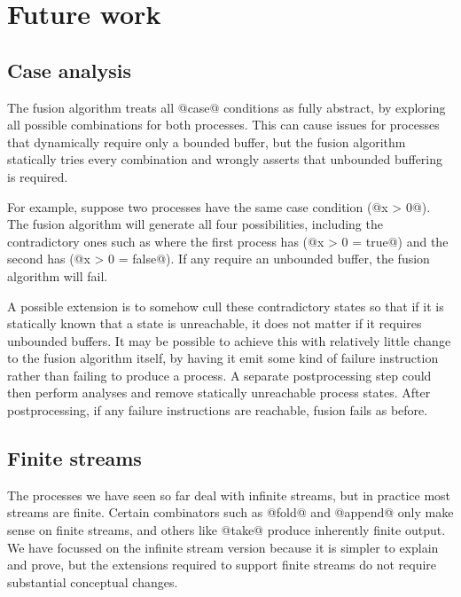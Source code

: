 
\section{Future work}
\label{s:FutureWork}


\subsection{Case analysis}
\label{s:FullyAbstractCase}

The fusion algorithm treats all @case@ conditions as fully abstract, by exploring all possible combinations for both processes.
This can cause issues for processes that dynamically require only a bounded buffer, but the fusion algorithm statically tries every combination and wrongly asserts that unbounded buffering is required.

For example, suppose two processes have the same case condition (@x > 0@).
The fusion algorithm will generate all four possibilities, including the contradictory ones such as where the first process has (@x > 0 = true@) and the second has (@x > 0 = false@).
If any require an unbounded buffer, the fusion algorithm will fail.

A possible extension is to somehow cull these contradictory states so that if it is statically known that a state is unreachable, it does not matter if it requires unbounded buffers.
It may be possible to achieve this with relatively little change to the fusion algorithm itself, by having it emit some kind of failure instruction rather than failing to produce a process.
A separate postprocessing step could then perform analyses and remove statically unreachable process states.
After postprocessing, if any failure instructions are reachable, fusion fails as before.


\subsection{Finite streams}
\label{s:Finite}

The processes we have seen so far deal with infinite streams, but in practice most streams are finite. Certain combinators such as @fold@ and @append@ only make sense on finite streams, and others like @take@ produce inherently finite output. We have focussed on the infinite stream version because it is simpler to explain and prove, but the extensions required to support finite streams do not require substantial conceptual changes.

